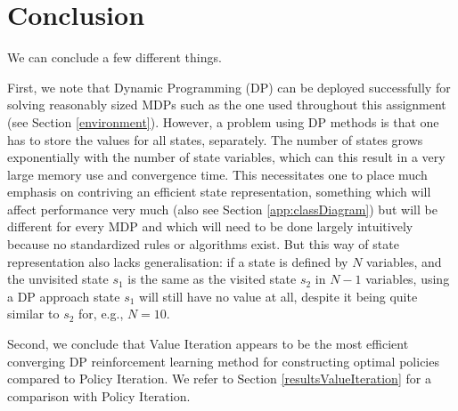 \documentclass{article}
\begin{document}
\section{Conclusion}
We can conclude a few different things.

First, we note that Dynamic Programming (DP) can be deployed successfully for solving reasonably sized MDPs such as the one used throughout this assignment (see Section \ref{environment}). However, a problem using DP methods is that one has to store the values for all states, separately. The number of states grows exponentially with the number of state variables, which can this result in a very large memory use and convergence time. This necessitates one to place much emphasis on contriving an efficient state representation, something which will affect performance very much \cite{sutton} (also see Section \ref{app:classDiagram}) but will be different for every MDP and which will need to be done largely intuitively because no standardized rules or algorithms exist. But this way of state representation also lacks generalisation: if a state is defined by $N$ variables, and the unvisited state $s_1$ is the same as the visited state $s_2$ in $N-1$ variables, using a DP approach state $s_1$ will still have no value at all, despite it being quite similar to $s_2$ for, e.g., $N=10$.

Second, we conclude that Value Iteration appears to be the most efficient converging DP reinforcement learning method for constructing optimal policies compared to Policy Iteration. We refer to Section \ref{resultsValueIteration} for a comparison with Policy Iteration. 


\newpage
\nocite{*}




\newpage
\appendix
\appendixpage
\end{document}
